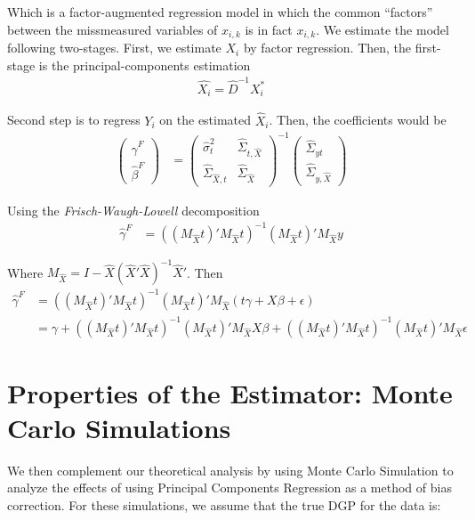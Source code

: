 \documentclass[12pt]{article}
\def\g{\gamma}
\begin{document}
Which is a factor-augmented regression model in which the common ``factors'' between the missmeasured variables of $x_{i,k}$ is in fact $x_{i,k}$. We estimate the model following two-stages. First, we estimate $X_i$ by factor regression. Then, the first-stage is the principal-components estimation
\begin{align}
    \hat{X_i}=\hat{D}^{-1}X_i^*
\end{align}

Second step is to regress $Y_i$ on the estimated $\hat X_i$. Then, the coefficients would be
\begin{align}
    \left(\begin{array}{l}
\hat{\gamma}^{F} \\
\hat{\beta}^{F}
\end{array}\right)&=\left(\begin{array}{cc}
\hat{\sigma}^2_{t} & \hat\Sigma_{t,\hat X} \\
\hat \Sigma_{\hat X,t} & \hat {\Sigma}_{\hat X}
\end{array}\right)^{-1}\left(\begin{array}{c}
\hat \Sigma_{yt} \\
\hat \Sigma_{y,\hat X}
\end{array}\right)
\end{align}

Using the \textit{Frisch-Waugh-Lowell} decomposition
\begin{align}
    \hat{\g}^F & = ((M_{\hat{X}}t)'M_{\hat{X}}t)^{-1}(M_{\hat{X}}t)'M_{\hat{X}}y
\end{align}

Where $M_{\hat{X}}=I-\hat{X}(\hat{X}'\hat{X})^{-1}\hat{X}'$. Then
\begin{align}
     \hat{\g}^F & = ((M_{\hat{X}}t)'M_{\hat{X}}t)^{-1}(M_{\hat{X}}t)'M_{\hat{X}}(t\gamma  + X\beta + \epsilon) \\
     &=\gamma +((M_{\hat{X}}t)'M_{\hat{X}}t)^{-1}(M_{\hat{X}}t)'M_{\hat{X}}X\beta+((M_{\hat{X}}t)'M_{\hat{X}}t)^{-1}(M_{\hat{X}}t)'M_{\hat{X}}\epsilon
\end{align}

    \section*{Properties of the Estimator: Monte Carlo Simulations}

        We then complement our theoretical analysis by using Monte Carlo Simulation to analyze the effects of using Principal Components Regression as a method of bias correction. For these simulations, we assume that the true DGP for the data is:
\end{document}

